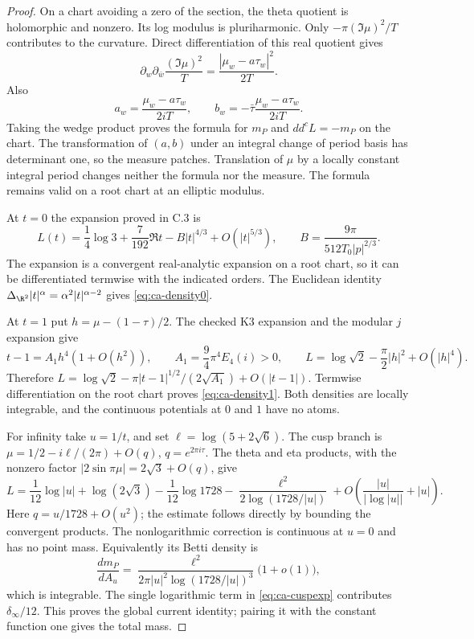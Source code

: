 \begin{proof}
On a chart avoiding a zero of the section, the theta quotient
is holomorphic and nonzero. Its log modulus is pluriharmonic.
Only $-\pi(\Im\mu)^2/T$ contributes to the curvature.
Direct differentiation of this real quotient gives
\[
 \partial_w\partial_{\bar w}\frac{(\Im\mu)^2}{T}
       =\frac{|\mu_w-a\tau_w|^2}{2T}.
\]
Also
\[
 a_w=\frac{\mu_w-a\tau_w}{2iT},\qquad
 b_w=-\bar\tau\frac{\mu_w-a\tau_w}{2iT}.
\]
Taking the wedge product proves the formula for $m_P$ and
$dd^cL=-m_P$ on the chart. The transformation of $(a,b)$
under an integral change of period basis has determinant one,
so the measure patches. Translation of $\mu$ by a locally
constant integral period changes neither the formula nor
the measure. The formula remains valid on a root chart
at an elliptic modulus.

At $t=0$ the expansion proved in C.3 is
\[
 L(t)=\frac14\log3+\frac7{192}\Re t
       -B|t|^{4/3}+O(|t|^{5/3}),\qquad
 B=\frac{9\pi}{512T_0|p|^{2/3}}.
\]
The expansion is a convergent real-analytic expansion on a
root chart, so it can be differentiated termwise with the
indicated orders. The Euclidean identity
$\Delta_{\R^2}|t|^\alpha=\alpha^2|t|^{\alpha-2}$ gives
\eqref{eq:ca-density0}.

At $t=1$ put $h=\mu-(1-\tau)/2$. The checked K3 expansion
and the modular $j$ expansion give
\[
 t-1=A_1h^4(1+O(h^2)),\qquad
 A_1=\frac94\pi^4E_4(i)>0,\qquad
 L=\log\sqrt2-\frac\pi2|h|^2+O(|h|^4).
\]
Therefore
$L=\log\sqrt2-\pi|t-1|^{1/2}/(2\sqrt{A_1})+O(|t-1|)$.
Termwise differentiation on the root chart proves
\eqref{eq:ca-density1}. Both densities are locally integrable,
and the continuous potentials at $0$ and $1$ have no atoms.

For infinity take $u=1/t$, and set $\ell=\log(5+2\sqrt6)$.
The cusp branch is
$\mu=1/2-i\ell/(2\pi)+O(q)$, $q=e^{2\pi i\tau}$.
The theta and eta products, with the nonzero factor
$|2\sin\pi\mu|=2\sqrt3+O(q)$, give
\begin{equation}\label{eq:ca-cuspexp}
 L=\frac1{12}\log|u|+\log(2\sqrt3)-\frac1{12}\log1728
          -\frac{\ell^2}{2\log(1728/|u|)}
          +O\left(\frac{|u|}{|\log|u||}+|u|\right).
\end{equation}
Here $q=u/1728+O(u^2)$; the estimate follows directly by
bounding the convergent products. The nonlogarithmic
correction is continuous at $u=0$ and has no point mass.
Equivalently its Betti density is
\[
 \frac{dm_P}{dA_u}
  =\frac{\ell^2}{2\pi|u|^2\log(1728/|u|)^3}
       \bigl(1+o(1)\bigr),
\]
which is integrable. The single logarithmic term in
\eqref{eq:ca-cuspexp} contributes $\delta_\infty/12$.
This proves the global current identity; pairing it with
the constant function one gives the total mass.
\end{proof}
